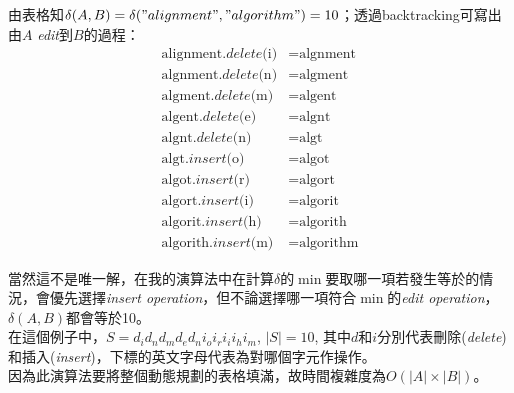 \documentclass[15pt]{extarticle}
\begin{document}
由表格知$\delta(A,B)=\delta("alignment","algorithm")=10$；透過backtracking可寫出由$A$ \textit{edit}到$B$的過程：
\begin{align}
\text{alignment.$delete$(i)} &= \text{algnment}  \\
\text{algnment.$delete$(n)} &= \text{algment}  \\
\text{algment.$delete$(m)} &= \text{algent}  \\
\text{algent.$delete$(e)} &= \text{algnt}  \\
\text{algnt.$delete$(n)} &= \text{algt}  \\
\text{algt.$insert$(o)} &= \text{algot}  \\
\text{algot.$insert$(r)} &= \text{algort}  \\
\text{algort.$insert$(i)} &= \text{algorit}  \\
\text{algorit.$insert$(h)} &= \text{algorith}  \\
\text{algorith.$insert$(m)} &= \text{algorithm}  
\end{align}

當然這不是唯一解，在我的演算法中在計算$\delta$的$\min$要取哪一項若發生等於的情況，會優先選擇\textit{insert operation}，但不論選擇哪一項符合$\min$的\textit{edit operation}，$\delta(A,B)$都會等於10。\\

在這個例子中，$S=d_id_nd_md_ed_ni_oi_ri_ii_hi_m$, $|S|=10$, 其中$d$和$i$分別代表刪除(\textit{delete})和插入(\textit{insert})，下標的英文字母代表為對哪個字元作操作。\\

因為此演算法要將整個動態規劃的表格填滿，故時間複雜度為$O(|A|\times|B|)$。





\end{document}
